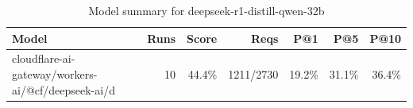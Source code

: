 \begin{table}[htbp]
\centering
\begin{tabular}{lrrrrrr}
\toprule
Model & Runs & Score & Reqs & P@1 & P@5 & P@10 \\
\midrule
cloudflare-ai-gateway/workers-ai/@cf/deepseek-ai/d & 10 & 44.4\% & 1211/2730 & 19.2\% & 31.1\% & 36.4\% \\
\bottomrule
\end{tabular}
\caption{Model summary for deepseek-r1-distill-qwen-32b}
\end{table}
